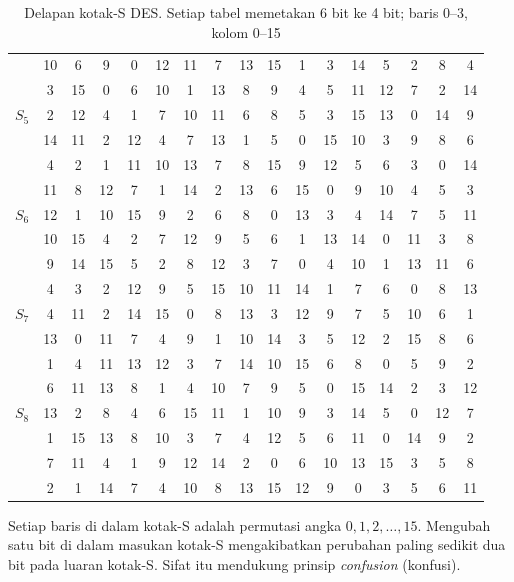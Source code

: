 \begin{table}[htbp]
\begin{tabular}{@{}l@{\hspace{5pt}}*{16}{c}@{}}
      & 10 & 6 & 9 & 0 & 12 & 11 & 7 & 13 & 15 & 1 & 3 & 14 & 5 & 2 & 8 & 4 \\
      & 3 & 15 & 0 & 6 & 10 & 1 & 13 & 8 & 9 & 4 & 5 & 11 & 12 & 7 & 2 & 14 \\[4pt]
$S_5$ & 2 & 12 & 4 & 1 & 7 & 10 & 11 & 6 & 8 & 5 & 3 & 15 & 13 & 0 & 14 & 9 \\
      & 14 & 11 & 2 & 12 & 4 & 7 & 13 & 1 & 5 & 0 & 15 & 10 & 3 & 9 & 8 & 6 \\
      & 4 & 2 & 1 & 11 & 10 & 13 & 7 & 8 & 15 & 9 & 12 & 5 & 6 & 3 & 0 & 14 \\
      & 11 & 8 & 12 & 7 & 1 & 14 & 2 & 13 & 6 & 15 & 0 & 9 & 10 & 4 & 5 & 3 \\[4pt]
$S_6$ & 12 & 1 & 10 & 15 & 9 & 2 & 6 & 8 & 0 & 13 & 3 & 4 & 14 & 7 & 5 & 11 \\
      & 10 & 15 & 4 & 2 & 7 & 12 & 9 & 5 & 6 & 1 & 13 & 14 & 0 & 11 & 3 & 8 \\
      & 9 & 14 & 15 & 5 & 2 & 8 & 12 & 3 & 7 & 0 & 4 & 10 & 1 & 13 & 11 & 6 \\
      & 4 & 3 & 2 & 12 & 9 & 5 & 15 & 10 & 11 & 14 & 1 & 7 & 6 & 0 & 8 & 13 \\[4pt]
$S_7$ & 4 & 11 & 2 & 14 & 15 & 0 & 8 & 13 & 3 & 12 & 9 & 7 & 5 & 10 & 6 & 1 \\
      & 13 & 0 & 11 & 7 & 4 & 9 & 1 & 10 & 14 & 3 & 5 & 12 & 2 & 15 & 8 & 6 \\
      & 1 & 4 & 11 & 13 & 12 & 3 & 7 & 14 & 10 & 15 & 6 & 8 & 0 & 5 & 9 & 2 \\
      & 6 & 11 & 13 & 8 & 1 & 4 & 10 & 7 & 9 & 5 & 0 & 15 & 14 & 2 & 3 & 12 \\[4pt]
$S_8$ & 13 & 2 & 8 & 4 & 6 & 15 & 11 & 1 & 10 & 9 & 3 & 14 & 5 & 0 & 12 & 7 \\
      & 1 & 15 & 13 & 8 & 10 & 3 & 7 & 4 & 12 & 5 & 6 & 11 & 0 & 14 & 9 & 2 \\
      & 7 & 11 & 4 & 1 & 9 & 12 & 14 & 2 & 0 & 6 & 10 & 13 & 15 & 3 & 5 & 8 \\
      & 2 & 1 & 14 & 7 & 4 & 10 & 8 & 13 & 15 & 12 & 9 & 0 & 3 & 5 & 6 & 11 \\
\end{tabular}
\caption{Delapan kotak-S DES. Setiap tabel memetakan 6 bit ke 4 bit; baris 0--3, kolom 0--15}
\label{tab:sbox-des}
\end{table}

Setiap baris di dalam kotak-S adalah permutasi angka $0, 1, 2, \dots, 15$.
Mengubah satu bit di dalam masukan kotak-S mengakibatkan perubahan paling
sedikit dua bit pada luaran kotak-S. Sifat itu mendukung prinsip
\textit{confusion} (konfusi).

